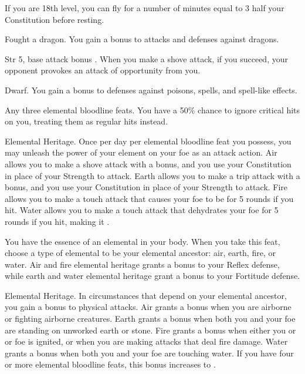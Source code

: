 If you are 18th level, you can fly for a number of minutes equal to 3 \add half your Constitution before resting.

\featpre Fought a dragon.
\featben You gain a  bonus to attacks and defenses against dragons.
\featspecial \featbanenotes

\featpre Str 5, base attack bonus .
\featben When you make a shove attack, if you succeed, your opponent provokes an attack of opportunity from you.

 Dwarf.
 You gain a  bonus to defenses against poisons, spells, and spell-like effects.

\featpre Any three elemental bloodline feats.
\featben You have a 50\% chance to ignore critical hits on you, treating them as regular hits instead.

\featpre Elemental Heritage.
\featben Once per day per elemental bloodline feat you possess, you may unleash the power of your element on your foe as an attack action. Air allows you to make a shove attack with a  bonus, and you use your Constitution in place of your Strength to attack. Earth allows you to make a trip attack with a  bonus, and you use your Constitution in place of your Strength to attack. Fire allows you to make a touch attack that causes your foe to be \ignited for 5 rounds if you hit. Water allows you to make a touch attack that dehydrates your foe for 5 rounds if you hit, making it \vulnerable.

\featben You have the essence of an elemental in your body. When you take this feat, choose a type of elemental to be your elemental ancestor: air, earth, fire, or water. Air and fire elemental heritage grants a  bonus to your Reflex defense, while earth and water elemental heritage grant a  bonus to your Fortitude defense.

\featpre Elemental Heritage.
\featben In circumstances that depend on your elemental ancestor, you gain a  bonus to physical attacks. Air grants a bonus when you are airborne or fighting airborne creatures. Earth grants a bonus when both you and your foe are standing on unworked earth or stone. Fire grants a bonus when either you or or foe is ignited, or when you are making attacks that deal fire damage. Water grants a bonus when both you and your foe are touching water. If you have four or more elemental bloodline feats, this bonus increases to .

